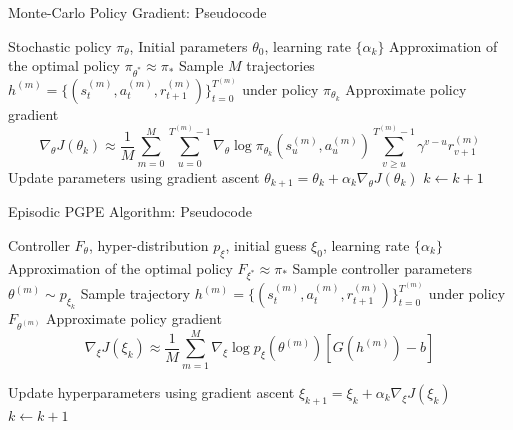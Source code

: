\begin{frame}{Monte-Carlo Policy Gradient: Pseudocode}
	\begin{algorithmic}[1]
		\Require Stochastic policy $\pi_\theta$, Initial parameters $\theta_0$, learning rate $\{\alpha_k\}$
		\Ensure Approximation of the optimal policy $\pi_{\theta^*} \approx \pi_*$
		\Repeat
			\State Sample $M$ trajectories $h^{(m)} = \{(s_t^{(m)}, a_t^{(m)}, r_{t+1}^{(m)})\}_{t = 0}^{T^{(m)}}$ under policy $\pi_{\theta_k}$   
			\State Approximate policy gradient 
			\begin{equation*}
				\nabla_\theta J(\theta_k) \approx \frac{1}{M} \sum_{m=0}^M
				 \sum_{u=0}^{T^{(m)}-1} \nabla_\theta\log \pi_{\theta_k} \left(s_u^{(m)}, a_u^{(m)}\right) 
				 \sum_{v \geq u}^{T^{(m)}-1} \gamma^{v-u} r_{v+1}^{(m)}   
			\end{equation*}
			\State Update parameters using gradient ascent $\theta_{k+1} = \theta_k + \alpha_k \nabla_\theta J(\theta_k)$
			\State $k \leftarrow k + 1$
	\end{algorithmic}
\end{frame}


\begin{frame}{Episodic PGPE Algorithm: Pseudocode}
	\begin{algorithmic}[1]
		\Require Controller $F_\theta$, hyper-distribution $p_\xi$, initial guess $\xi_0$, learning rate $\{\alpha_k\}$
		\Ensure Approximation of the optimal policy $F_{\xi^*} \approx \pi_*$
		\Repeat
				\State Sample controller parameters $\theta^{(m)} \sim p_{\xi_k}$ 
				\State Sample trajectory $h^{(m)} = \{(s_t^{(m)}, a_t^{(m)}, r_{t+1}^{(m)})\}_{t = 0}^{T^{(m)}}$ under policy $F_{\theta^{(m)}}$
			\EndFor
			\State Approximate policy gradient 
		  		\begin{equation*}
		  		\nabla_\xi J(\xi_k) \approx \frac{1}{M} \sum^{M}_{m=1} \nabla_\xi \log p_\xi\left(\theta^{(m)}\right) \left[G\left(h^{(m)}\right)-b\right] 
		  		\end{equation*}
		  		
			\State Update hyperparameters using gradient ascent $\xi_{k+1} = \xi_k + \alpha_k \nabla_\xi J(\xi_k)$
			\State $k \leftarrow k + 1$
	\end{algorithmic}
\end{frame}

